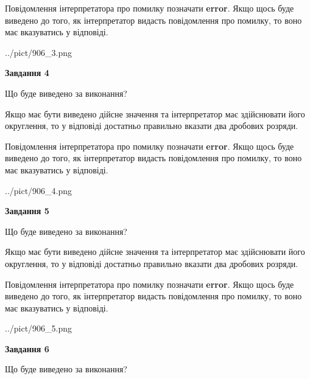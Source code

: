 \documentclass[12pt, ukrainian]{article}
\begin{document}
{\begin {Large}
Повідомлення інтерпретатора про помилку позначати \textbf{error}.
Якщо щось буде виведено до того, як інтерпретатор видасть повідомлення про помилку, 
то воно має вказуватись у відповіді. \par

\begin{center}
	{../pict/906_3.png}
\end{center}
\newpage

{\begin {center}\textbf{Завдання 4}\end {center}}\par
Що буде виведено за виконання? \par

Якщо має бути виведено дійсне значення та інтерпретатор має здійснювати його округлення, 
то у відповіді достатньо правильно вказати два дробових розряди.

Повідомлення інтерпретатора про помилку позначати \textbf{error}.
Якщо щось буде виведено до того, як інтерпретатор видасть повідомлення про помилку, 
то воно має вказуватись у відповіді. \par

\begin{center}
	{../pict/906_4.png}
\end{center}
\newpage

{\begin {center}\textbf{Завдання 5}\end {center}}\par
Що буде виведено за виконання? \par

Якщо має бути виведено дійсне значення та інтерпретатор має здійснювати його округлення, 
то у відповіді достатньо правильно вказати два дробових розряди.

Повідомлення інтерпретатора про помилку позначати \textbf{error}.
Якщо щось буде виведено до того, як інтерпретатор видасть повідомлення про помилку, 
то воно має вказуватись у відповіді. \par

\begin{center}
	{../pict/906_5.png}
\end{center}
\newpage

{\begin {center}\textbf{Завдання 6}\end {center}}\par
Що буде виведено за виконання? \par


\end{Large}}
\end{document}
